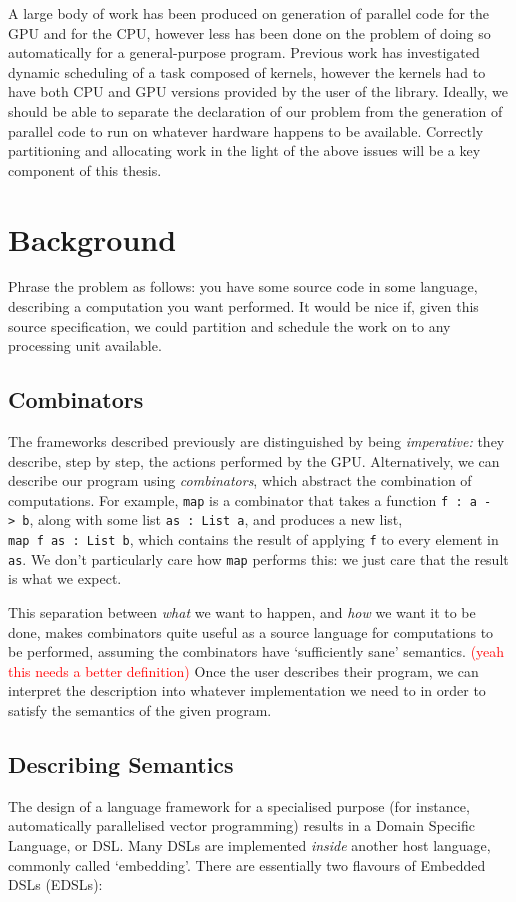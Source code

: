 \documentclass[a4paper,12pt]{article}
\newcommand{\red}[1]{\textcolor{red}{#1}}
\newcommand{\icf}[1]{\mbox{\texttt{#1}}} %
\begin{document}
A large body of work has been produced on generation of parallel code for the GPU and for the CPU, \citep{lee_transparent_2013} however less has been done on the problem of doing so automatically for a general-purpose program. 
Previous work has investigated dynamic scheduling of a task composed of kernels, however the kernels had to have both CPU and GPU versions provided by the user of the library.  \citep{wang_cpu+gpu_2014}
Ideally, we should be able to separate the declaration of our problem from the generation of parallel code to run on whatever hardware happens to be available.
Correctly partitioning and allocating work in the light of the above issues will be a key component of this thesis.

\section{Background}
Phrase the problem as follows: you have some source code in some language, describing a computation you want performed. 
It would be nice if, given this source specification, we could partition and schedule the work on to any processing unit available. 

\subsection{Combinators}
The frameworks described previously are distinguished by being \textit{imperative:} they describe, step by step, the actions performed by the GPU.
Alternatively, we can describe our program using \textit{combinators}, which abstract the combination of computations. 
For example, \icf{map} is a combinator that takes a function \icf{f\ :\  a\ ->\ b}, along with some list \icf{as\ :\ List\ a}, and produces a new list, \icf{map\ f\ as\ :\ List\ b}, which contains the result of applying \icf{f} to every element in \icf{as}. 
We don't particularly care how \icf{map} performs this: we just care that the result is what we expect.

This separation between \textit{what} we want to happen, and \textit{how} we want it to be done, makes combinators quite useful as a source language for computations to be performed, assuming the combinators have `sufficiently sane' semantics. 
\red{(yeah this needs a better definition)} 
Once the user describes their program, we can interpret the description into whatever implementation we need to in order to satisfy the semantics of the given program.

\subsection{Describing Semantics}
The design of a language framework for a specialised purpose (for instance, automatically parallelised vector programming) results in a Domain Specific Language, or DSL. 
Many DSLs are implemented \textit{inside} another host language, commonly called `embedding'. There are essentially two flavours of Embedded DSLs (EDSLs):
\end{document}
